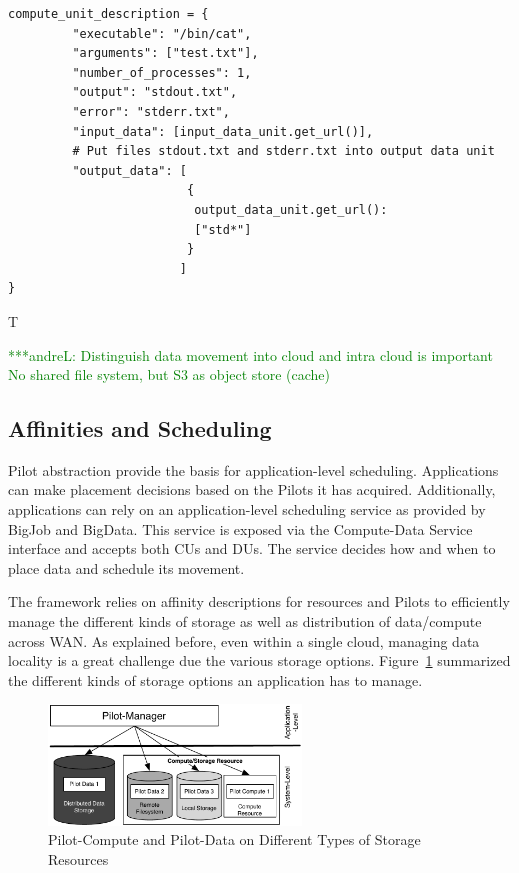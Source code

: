 \documentclass[times]{cpeauth}
\newcommand{\alnote}[1]{ {\textcolor{green} { ***andreL: #1 }}}
\newcommand{\alnote}[1]{}
\newcommand{\pilot}{Pilot\xspace}
\newcommand{\pilots}{Pilots\xspace}
\newcommand{\computedataservice}{Compute-Data Service\xspace}
\newcommand{\computeunit}{Compute-Unit\xspace}
\newcommand{\dataunit}{Data-Unit\xspace}
\newcommand{\dus}{DUs\xspace}
\newcommand{\cus}{CUs\xspace}
\begin{document}
\begin{lstlisting}[caption={{Managing \dataunit/\computeunit Dependencies}}, style=myPythonListing, label={lst:cu_du_dependencies}, float=t]
compute_unit_description = {
         "executable": "/bin/cat",
         "arguments": ["test.txt"],
         "number_of_processes": 1,
         "output": "stdout.txt",
         "error": "stderr.txt",   
         "input_data": [input_data_unit.get_url()],
         # Put files stdout.txt and stderr.txt into output data unit
         "output_data": [
                         {
                          output_data_unit.get_url(): 
                          ["std*"]
                         }
                        ]    
}
\end{lstlisting}

T

\alnote{
Distinguish data movement into cloud and intra cloud is important
No shared file system, but S3 as object store (cache)
}


\subsection{Affinities and Scheduling}

\pilot abstraction provide the basis for application-level scheduling.
Applications can make placement decisions based on the \pilots it has
acquired. Additionally, applications can rely on an application-level
scheduling service as provided by BigJob and BigData. This service is exposed
via the \computedataservice interface and accepts both \cus and \dus. The
service decides how and when to place data and schedule its movement.

The framework relies on affinity descriptions for resources and \pilots to 
efficiently manage the different kinds of storage as well as distribution of 
data/compute across WAN. As explained before, even within a single cloud, 
managing data locality is a great challenge due the various storage options. 
Figure~\ref{fig:figures_storage-types} summarized the different kinds of 
storage options an application has to manage. 

\begin{figure}[t]
	\centering
		\includegraphics[width=0.6\textwidth]{figures/storage-types.pdf}
                \caption{Pilot-Compute and Pilot-Data on Different
                  Types of Storage Resources}
	\label{fig:figures_storage-types}
\end{figure}
\end{document}
